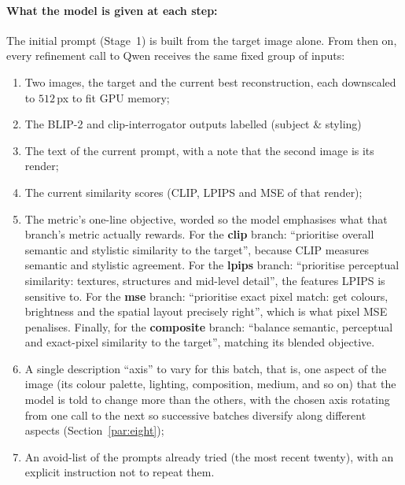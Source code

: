 \documentclass[runningheads]{llncs}
\begin{document}
\paragraph{\normalfont\textbf{What the model is given at each step:}} The initial prompt (Stage~1) is built from the target image alone. From then on, every refinement call to Qwen receives the same fixed group of inputs:
  \begin{enumerate}
    \item Two images, the target and the current best reconstruction, each downscaled to $512$\,px to fit GPU memory;
    \item The BLIP-2 and clip-interrogator outputs labelled (subject \& styling)
    \item The text of the current prompt, with a note that the second image is its render;
    \item The current similarity scores (CLIP, LPIPS and MSE of that render);
    \item The metric's one-line objective, worded so the model emphasises what that branch's metric actually rewards. For the \textbf{clip} branch: ``prioritise overall semantic and stylistic similarity to the target'', because CLIP measures semantic and stylistic agreement. For the \textbf{lpips} branch: ``prioritise perceptual similarity: textures, structures and mid-level detail'', the features LPIPS is sensitive to. For the \textbf{mse} branch: ``prioritise exact pixel match: get colours, brightness and the spatial layout precisely right'', which is what pixel MSE penalises. Finally, for the \textbf{composite} branch: ``balance semantic, perceptual and exact-pixel similarity to the target'', matching its blended objective.
    \item A single description ``axis'' to vary for this batch, that is, one aspect of the image (its colour palette, lighting, composition, medium, and so on) that the model is told to change more than the others, with the chosen axis rotating from one call to the next so successive batches diversify along different aspects (Section~\ref{par:eight});
    \item An avoid-list of the prompts already tried (the most recent twenty), with an explicit instruction not to repeat them.
\end{enumerate}
\noindent
\end{document}
